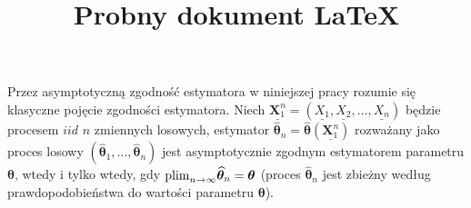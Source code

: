\documentclass{article} %
\title{\Large{\textbf{Probny dokument \LaTeX}}}
\begin{document}
\maketitle

\noindent Przez asymptotyczn\k{a} zgodno\'{s}\'{c} estymatora w niniejszej pracy rozumie si\k{e} klasyczne poj\k{e}cie zgodno\'{s}ci estymatora. Niech $\underline{\mathbf{X}_{1}^{n}} =(\underline{X_{1}} ,\underline{X_{2}} ,\ldots , \underline{X_{n}} )$ b\k{e}dzie procesem $iid$ $n$ zmiennych losowych, estymator $\bm{\widehat{\theta }}_{n} = \bm{\widehat{\theta }}(\underline{\mathbf{X}_{1}^{n}} )$ rozwa\.{z}any jako proces losowy $\left(\bm{\widehat{\theta }}_{1} ,\ldots , \bm{\widehat{\theta }}_{n} \right)$  jest asymptotycznie zgodnym estymatorem parametru $\bm{\theta} $, wtedy i tylko wtedy, gdy ${\rm plim}_{n\to \infty } \bm{\widehat{\theta }}_{n} = \bm{\theta} $ (proces $\bm{\widehat{\theta }}_{n} $ jest zbie\.{z}ny wed{\l}ug prawdopodobie\'{n}stwa do warto\'{s}ci parametru $\bm{\theta} $).
\end{document}
